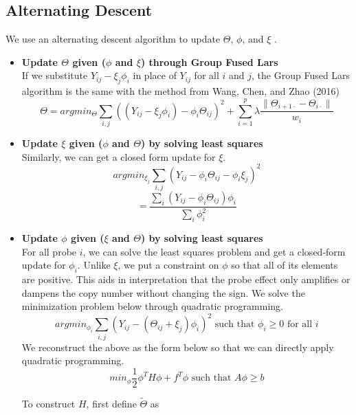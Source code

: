 \documentclass[11pt]{article}
\begin{document}
\subsection{Alternating Descent}
We use an alternating descent algorithm to update $\Theta$, $\phi$, and $\xi$ \cite{wang2016estimating}. 
\begin{itemize}
\item
\textbf{Update $\Theta$ given ($\phi$ and $\xi$) through Group Fused Lars \cite{bleakley2011group}}\\
If we substitute $Y_{ij} - \xi_j \phi_i$ in place of $Y_{ij}$ for all $i$ and $j$, the Group Fused Lars algorithm is the same with the method from Wang, Chen, and Zhao (2016) \cite{wang2016estimating}
$$\Theta = argmin_{\Theta} \sum_{i,j} ((Y_{ij} - \xi_j \phi_i) - \phi_i \Theta_{ij})^2 + \sum_{i=1}^{p} \lambda \frac{\|\Theta_{i+1\cdot} - \Theta_{i\cdot}  \|}{w_i} $$

\item
\textbf{Update $\xi$ given ($\phi$ and $\Theta$) by solving least squares}\\
Similarly, we can get a closed form update for $\xi$.
$$argmin_{\xi_j} \sum_{i,j} (Y_{ij} - \phi_i \Theta_{ij} - \phi_i \xi_j)^2$$
$$= \frac{
\sum_i (Y_{ij}-\phi_i \Theta_{ij})\phi_i
}{
\sum_i \phi_i^2
}$$

\item
\textbf{Update $\phi$  given ($\xi$ and $\Theta$) by solving least squares\cite{liao2014coneproj}}\\
For all probe $i$, we can solve the least squares problem and get a closed-form update for $\phi_i$. Unlike $\xi$, we put a constraint on $\phi$ so that all of its elements are positive. This aids in interpretation that the probe effect only amplifies or dampens the copy number without changing the sign. We solve the minimization problem below through quadratic programming.
$$argmin_{\phi_i} \sum_{i,j}(Y_{ij} - (\Theta_{ij}+\xi_j)\phi_i)^2 \text{ such that } \phi_i \geq 0\text{ for all } i$$
We reconstruct the above as the form below so that we can directly apply quadratic programming.
$$min_{\phi} \frac{1}{2} \phi^T H \phi + f^T \phi \text{ such that } A\phi \geq b$$

To construct $H$, first define $\tilde{\Theta}$ as


\end{itemize}
\end{document}

